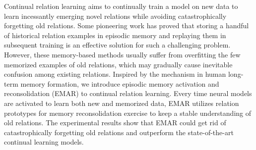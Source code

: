 Continual relation learning aims to continually train a model on new data to learn incessantly emerging novel relations while avoiding catastrophically forgetting old relations. Some pioneering work has proved that storing a handful of historical relation examples in episodic memory and replaying them in subsequent training is an effective solution for such a challenging problem. However, these memory-based methods usually suffer from overfitting the few memorized examples of old relations, which may gradually cause inevitable confusion among existing relations. Inspired by the mechanism in human long-term memory formation, we introduce episodic memory activation and reconsolidation (EMAR) to continual relation learning. Every time neural models are activated to learn both new and memorized data, EMAR utilizes relation prototypes for memory reconsolidation exercise to keep a stable understanding of old relations. The experimental results show that EMAR could get rid of catastrophically forgetting old relations and outperform the state-of-the-art continual learning models.
